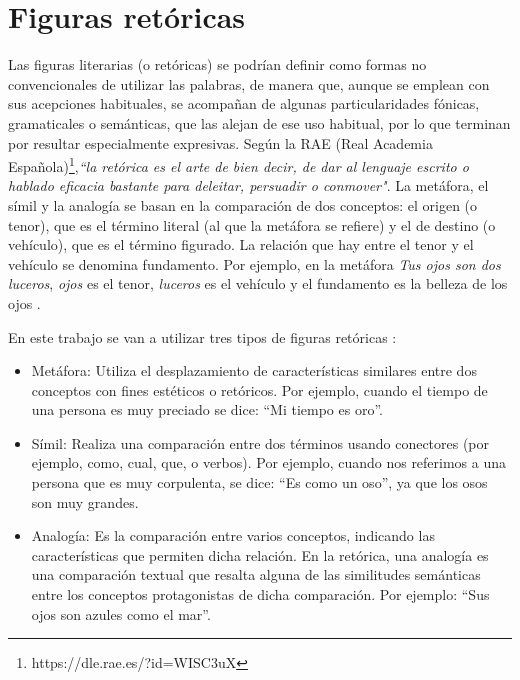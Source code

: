 


\section{Figuras retóricas}
\label{cap:sec:figurasretoricas}

Las figuras literarias (o retóricas) se podrían definir como formas no convencionales de utilizar las palabras, de manera que, aunque se emplean con sus acepciones habituales, se acompañan de algunas particularidades fónicas, gramaticales o semánticas, que las alejan de ese uso habitual, por lo que terminan por resultar especialmente expresivas. 
Según la RAE (Real Academia Española)\footnote{https://dle.rae.es/?id=WISC3uX},\textit{``la retórica es el arte de bien decir, de dar al lenguaje escrito o hablado eficacia bastante para deleitar, persuadir o conmover"}.
La metáfora, el símil y la analogía se basan en la comparación de dos conceptos: el origen (o tenor), que es el término literal (al que la metáfora se refiere) y el de destino (o vehículo), que es el término figurado. La relación que hay entre el tenor y el vehículo se denomina fundamento. Por ejemplo, en la metáfora \textit{Tus ojos son dos luceros}, \textit{ojos} es el tenor, \textit{luceros} es el vehículo y el fundamento es la belleza de los ojos \citep{GalianaYCasas1994}.


En este trabajo se van a utilizar tres tipos de figuras retóricas \citep{TFMPaloma}: 
\begin{itemize}
	\item Metáfora: Utiliza el desplazamiento de características similares entre dos conceptos con fines estéticos o retóricos. Por ejemplo, cuando el tiempo de una persona es muy preciado se dice: ``Mi tiempo es oro''.
	
	\item Símil: Realiza una comparación entre dos términos usando conectores (por ejemplo, como, cual, que, o verbos).
	Por ejemplo, cuando nos referimos a una persona que es muy corpulenta, se dice: ``Es como un oso'', ya que los osos son muy grandes.
	
	\item Analogía: Es la comparación entre varios conceptos, indicando las características que permiten dicha relación. En la retórica, una analogía es una comparación textual que resalta alguna de las similitudes semánticas entre los conceptos protagonistas de dicha comparación. Por ejemplo: ``Sus ojos son azules como el mar''.
	
	
	
\end{itemize}

